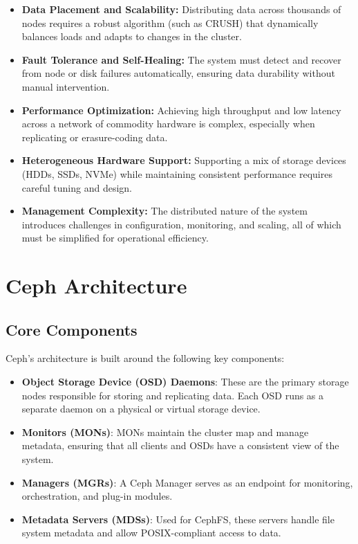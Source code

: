 \begin{itemize}
    \item \textbf{Data Placement and Scalability:} Distributing data across thousands of nodes requires a robust algorithm (such as CRUSH) that dynamically balances loads and adapts to changes in the cluster. 
    \item \textbf{Fault Tolerance and Self-Healing:} The system must detect and recover from node or disk failures automatically, ensuring data durability without manual intervention. 
    \item \textbf{Performance Optimization:} Achieving high throughput and low latency across a network of commodity hardware is complex, especially when replicating or erasure-coding data. 
    \item \textbf{Heterogeneous Hardware Support:} Supporting a mix of storage devices (HDDs, SSDs, NVMe) while maintaining consistent performance requires careful tuning and design. 
    \item \textbf{Management Complexity:} The distributed nature of the system introduces challenges in configuration, monitoring, and scaling, all of which must be simplified for operational efficiency. 
\end{itemize}

\section{Ceph Architecture}

\subsection{Core Components}

Ceph's architecture is built around the following key components:

\begin{itemize}
    \item \textbf{Object Storage Device (OSD) Daemons}: These are the primary storage nodes responsible for storing and replicating data. Each OSD runs as a separate daemon on a physical or virtual storage device.
    \item \textbf{Monitors (MONs)}: MONs maintain the cluster map and manage metadata, ensuring that all clients and OSDs have a consistent view of the system.
    \item \textbf{Managers (MGRs)}: A Ceph Manager serves as an endpoint for monitoring, orchestration, and plug-in modules.
    \item \textbf{Metadata Servers (MDSs)}: Used for CephFS, these servers handle file system metadata and allow POSIX-compliant access to data.
\end{itemize}

